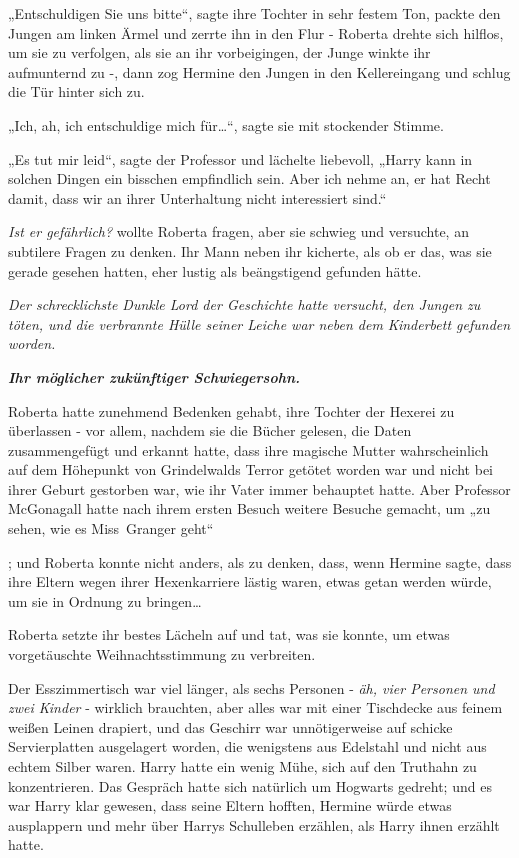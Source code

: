 {„Entschuldigen Sie uns bitte“, sagte ihre Tochter in sehr festem Ton, packte den Jungen am linken Ärmel und zerrte ihn in den Flur - Roberta drehte sich hilflos, um sie zu verfolgen, als sie an ihr vorbeigingen, der Junge winkte ihr aufmunternd zu -, dann zog Hermine den Jungen in den Kellereingang und schlug die Tür hinter sich zu.

„Ich, ah, ich entschuldige mich für…“, sagte sie mit stockender Stimme.

„Es tut mir leid“, sagte der Professor und lächelte liebevoll, „Harry kann in solchen Dingen ein bisschen empfindlich sein. Aber ich nehme an, er hat Recht damit, dass wir an ihrer Unterhaltung nicht interessiert sind.“

\emph{Ist er gefährlich?} wollte Roberta fragen, aber sie schwieg und versuchte, an subtilere Fragen zu denken. Ihr Mann neben ihr kicherte, als ob er das, was sie gerade gesehen hatten, eher lustig als beängstigend gefunden hätte.

\emph{Der schrecklichste Dunkle Lord der Geschichte hatte versucht, den Jungen zu töten, und die verbrannte Hülle seiner Leiche war neben dem Kinderbett gefunden worden.}

\textbf{\emph{Ihr möglicher zukünftiger Schwiegersohn.}}

Roberta hatte zunehmend Bedenken gehabt, ihre Tochter der Hexerei zu überlassen - vor allem, nachdem sie die Bücher gelesen, die Daten zusammengefügt und erkannt hatte, dass ihre magische Mutter wahrscheinlich auf dem Höhepunkt von Grindelwalds Terror getötet worden war und nicht bei ihrer Geburt gestorben war, wie ihr Vater immer behauptet hatte. Aber Professor McGonagall hatte nach ihrem ersten Besuch weitere Besuche gemacht, um „zu sehen, wie es Miss~Granger geht“

; und Roberta konnte nicht anders, als zu denken, dass, wenn Hermine sagte, dass ihre Eltern wegen ihrer Hexenkarriere lästig waren, etwas getan werden würde, um sie in Ordnung zu bringen…

Roberta setzte ihr bestes Lächeln auf und tat, was sie konnte, um etwas vorgetäuschte Weihnachtsstimmung zu verbreiten.

Der Esszimmertisch war viel länger, als sechs Personen - \emph{äh, vier Personen und zwei Kinder} - wirklich brauchten, aber alles war mit einer Tischdecke aus feinem weißen Leinen drapiert, und das Geschirr war unnötigerweise auf schicke Servierplatten ausgelagert worden, die wenigstens aus Edelstahl und nicht aus echtem Silber waren. Harry hatte ein wenig Mühe, sich auf den Truthahn zu konzentrieren. Das Gespräch hatte sich natürlich um Hogwarts gedreht; und es war Harry klar gewesen, dass seine Eltern hofften, Hermine würde etwas ausplappern und mehr über Harrys Schulleben erzählen, als Harry ihnen erzählt hatte.

}
